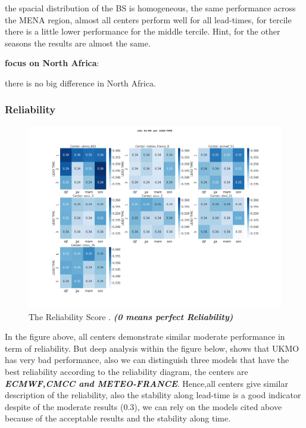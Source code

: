 the spacial distribution of the BS is homogeneous, the same performance across the MENA region, almost all centers perform well for all lead-times, for  tercile there is a little lower performance for the middle tercile.
Hint, for the other seasons the results are almost the same. 

\vspace{1.5cm}
\textbf{focus on North Africa}:

there is no big difference in North Africa.


\subsubsection{Reliability}

\begin{figure}[H]
    \centering
    \includegraphics[scale=0.25]{plots/prob/rela/rela_RR.png}
    \caption{The Reliability Score  . \textbf{\textit{(0 means perfect Reliability)}}}
\end{figure}

In the figure above, all centers demonstrate similar moderate performance in term of reliability. But deep analysis within the figure below, shows that UKMO has very bad performance, also we can distinguish three models that have the best reliability according to the reliability diagram, the centers are \textbf{\textit{ECMWF,CMCC and METEO-FRANCE}}. Hence,all centers give similar description of the reliability, also the stability along lead-time is a good indicator despite of the moderate results (0.3), we can rely on the models cited above because of the acceptable results and the stability along time.

